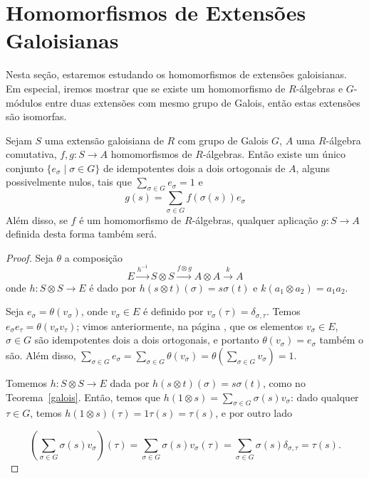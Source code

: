 \section{Homomorfismos de Extensões Galoisianas} \label{sec:homext}
Nesta seção, estaremos estudando os homomorfismos de extensões galoisi\-anas. Em especial, iremos mostrar que se existe um homomorfismo de $R$-álgebras e $G$-módulos entre duas extensões com mesmo grupo de Galois, então estas extensões são isomorfas.
\begin{teo} \label{teo:homom}
Sejam $S$ uma extensão galoisiana de $R$ com grupo de Galois $G$, $A$ uma $R$-álgebra comutativa, $f,g : S \rightarrow A$ homomorfismos de $R$-álgebras. Então existe um único conjunto $\{e_\sigma \mid \sigma\in G\}$ de idempotentes dois a dois ortogonais de $A$, alguns possivelmente nulos, tais que $\sum_{\sigma \in G} e_\sigma =1$ e \[g(s)=\sum_{\sigma \in G} f(\sigma(s))e_\sigma\]
Além disso, se $f$ é  um homomorfismo de $R$-álgebras, qualquer aplicação $g: S \rightarrow A$ definida desta forma também será.
\begin{proof}
Seja $\theta$ a composição\[ E \xrightarrow{h^{-1}} S\otimes S \xrightarrow{f\otimes g} A\otimes A \xrightarrow{k} A\]
onde $h: S\otimes S \rightarrow E$ é dado por $h(s\otimes t)(\sigma) = s\sigma(t)$ e $k(a_1\otimes a_2)=a_1a_2$. \par 
Seja $e_\sigma = \theta(v_\sigma)$, onde $v_\sigma \in E$ é definido por $v_\sigma(\tau)=\delta_{\sigma,\tau}$. Temos $e_\sigma e_\tau = \theta(v_\sigma v_\tau)$; vimos anteriormente, na página \pageref{alg:E}, que os elementos $v_\sigma \in E$, $\sigma \in G$ são idempotentes dois a dois ortogonais, e portanto $\theta(v_\sigma)=e_\sigma$ também o são. Além disso, $\sum_{\sigma \in G}e_\sigma = \sum_{\sigma \in G} \theta(v_\sigma) = \theta\left(\sum_{\sigma\in G} v_\sigma\right)=1$. \par
Tomemos $h:S\otimes S \rightarrow E$ dada por $h(s\otimes t)(\sigma)=s\sigma(t)$, como no Teorema~\ref{galois}. Então, temos que $h(1\otimes s) = \sum_{\sigma\in G} \sigma(s)v_\sigma$: dado qualquer $\tau \in G$, temos $h(1\otimes s)(\tau) = 1\tau(s) =\tau(s)$, e por outro lado

\[\left(\sum_{\sigma \in G} \sigma(s)v_\sigma\right)(\tau) = \sum_{\sigma\in G}\sigma(s)v_\sigma(\tau) = \sum_{\sigma\in G}\sigma(s)\delta_{\sigma,\tau}= \tau(s). \]


\end{proof}
\end{teo}
